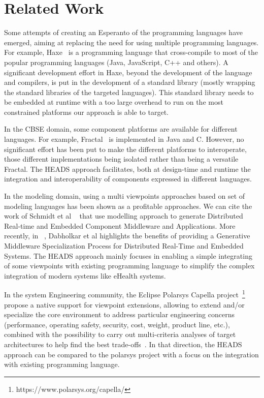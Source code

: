 \section{Related Work}

Some attempts of creating an Esperanto of the programming languages have emerged, aiming at replacing the need for using multiple programming languages. For example, Haxe~\cite{dasnois2011haxe} is a programming language that cross-compile to most of the popular programming languages (Java, JavaScript, C++ and others). A significant development effort in Haxe, beyond the development of the language and compilers, is put in the development of a standard library (mostly wrapping the standard libraries of the targeted languages). This standard library needs to be embedded at runtime with a too large overhead to run on the most constrained platforms our approach is able to target. 

In the CBSE domain, some component platforms are available for different languages. For example, Fractal~\cite{bruneton2006fractal} is implemented in Java and C. However, no significant effort has been put to make the different platforms to interoperate, those different implementations being isolated rather than being a versatile Fractal. The HEADS approach facilitates, both at design-time and runtime the integration and interoperability of components expressed in different languages.

In the modeling domain, using a multi viewpoints approaches based on set of modeling languages has been shown as a profitable approaches. We can cite the work of Schmidt et al ~\cite{DBLP:conf/middleware/GokhaleSLNW03} that use modelling approach to generate Distributed Real-time and Embedded Component Middleware and Applications. More recently, in  ~\cite{5753608}, Dabholkar et al highlights the benefits of providing a Generative Middleware Specialization Process for Distributed Real-Time and Embedded Systems.  The HEADS approach  mainly focuses in enabling a simple integrating of some viewpoints with existing programming language to simplify the complex integration of modern systems like eHealth systems. 

In the system Engineering community, the Eclipse Polarsys Capella project~\footnote{https://www.polarsys.org/capella/} propose a native support for viewpoint extensions, allowing to extend and/or specialize the core environment to address particular engineering concerns (performance, operating safety, security, cost, weight, product line, etc.), combined with the possibility to carry out multi-criteria analyses of target architectures to help find the best trade-offs~\cite{voirin2013arcadia}. In that direction, the HEADS approach can be compared to the polarsys project with a focus on the integration with existing programming language.

